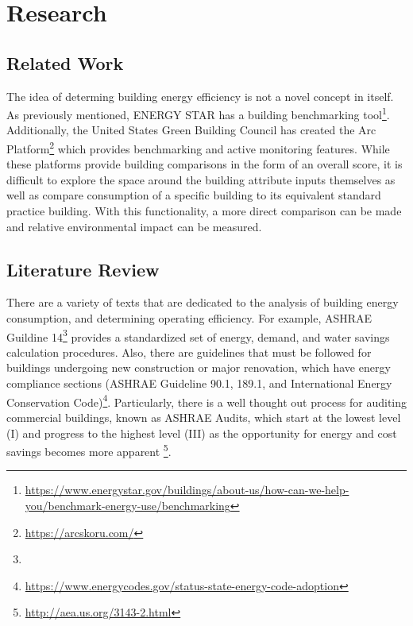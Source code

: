 \section{Research}
\label{sec:literature_review}

\subsection{Related Work}
The idea of determing building energy efficiency is not a novel concept in itself.  As previously mentioned, ENERGY STAR has a building benchmarking tool\footnote{\href{https://www.energystar.gov/buildings/about-us/how-can-we-help-you/benchmark-energy-use/benchmarking }{\url{https://www.energystar.gov/buildings/about-us/how-can-we-help-you/benchmark-energy-use/benchmarking}}}.  Additionally, the United States Green Building Council has created the Arc Platform\footnote{\href{https://arcskoru.com/}{\url{https://arcskoru.com/}}} which provides benchmarking and active monitoring features.  While these platforms provide building comparisons in the form of an overall score, it is difficult to explore the space around the building attribute inputs themselves as well as compare consumption of a specific building to its equivalent standard practice building.  With this functionality, a more direct comparison can be made and relative environmental impact can be measured.

\subsection{Literature Review}

There are a variety of texts that are dedicated to the analysis of building energy consumption, and determining operating efficiency.  For example, ASHRAE Guildine 14\footnote{} provides a standardized set of energy, demand, and water savings calculation procedures.  Also, there are guidelines that must be followed for buildings undergoing new construction or major renovation, which have energy compliance sections (ASHRAE Guideline 90.1, 189.1, and International Energy Conservation Code)\footnote{\href{https://www.energycodes.gov/status-state-energy-code-adoption}{\url{https://www.energycodes.gov/status-state-energy-code-adoption}}}.  Particularly, there is a well thought out process for auditing commercial buildings, known as ASHRAE Audits, which start at the lowest level (I) and progress to the highest level (III) as the opportunity for energy and cost savings becomes more apparent \footnote{\href{http://aea.us.org/3143-2.html}{\url{http://aea.us.org/3143-2.html}}}.  